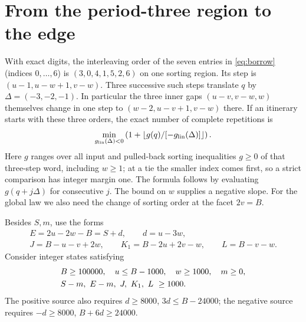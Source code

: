 \documentclass[11pt,reqno]{amsart}
\begin{document}
\section{From the period-three region to the edge}\label{sec:facet}
With exact digits, the interleaving order of the seven entries in
\eqref{eq:borrow} (indices $0,\ldots,6$) is $(3,0,4,1,5,2,6)$ on
one sorting region. Its step is $(u-1,u-w+1,v-w)$.
Three successive such steps translate $q$ by $\Delta=(-3,-2,-1)$.
In particular the three inner gaps $(u-v,v-w,w)$ themselves change
in one step to $(w-2,u-v+1,v-w)$ there. If an itinerary starts with
these three orders, the exact number of complete repetitions is
\[
 \min_{g_{\rm lin}(\Delta)<0}
 \left(1+\left\lfloor g(q)/[-g_{\rm lin}(\Delta)]\right\rfloor\right).
\]
Here $g$ ranges over all input and pulled-back sorting inequalities
$g\ge0$ of that three-step word, including $w\ge1$; at a tie the
smaller index comes first, so a strict comparison has integer margin one.
The formula follows by evaluating $g(q+j\Delta)$ for consecutive $j$.
The bound on $w$ supplies a negative slope. For the global law we also
need the change of sorting order at the facet $2v=B$.

Besides $S,m$, use the forms
\[
 \begin{gathered}
 E=2u-2w-B=S+d,\qquad d=u-3w,\\
 J=B-u-v+2w,\qquad K_1=B-2u+2v-w,\qquad L=B-v-w .
 \end{gathered}
\]
Consider integer states satisfying
\begin{align}
 &B\ge100000,\quad u\le B-1000,\quad w\ge1000,\quad m\ge0,\notag\\
 &S-m,\ E-m,\ J,\ K_1,\ L\ \ge1000. \label{eq:source}
\end{align}
The positive source also requires $d\ge8000$, $3d\le B-24000$; the
negative source requires $-d\ge8000$, $B+6d\ge24000$.
\end{document}
